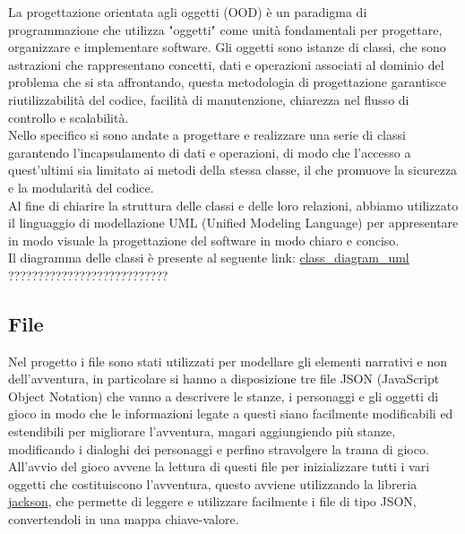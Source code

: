 \documentclass[italian,12pt,a4paper]{article}
\begin{document}
	La progettazione orientata agli oggetti (OOD) è un paradigma di programmazione che utilizza "oggetti" come unità fondamentali per progettare, organizzare e implementare software. Gli oggetti sono istanze di classi, che sono astrazioni che rappresentano concetti, dati e operazioni associati al dominio del problema che si sta affrontando, questa metodologia di progettazione garantisce riutilizzabilità del codice, facilità di manutenzione, chiarezza nel flusso di controllo e scalabilità.\\
	\linebreak
	Nello specifico si sono andate a progettare e realizzare una serie di classi garantendo l'incapsulamento di dati e operazioni, di modo che l'accesso a quest'ultimi sia limitato ai metodi della stessa classe, il che promuove la sicurezza e la modularità del codice.\\
	\linebreak
	Al fine di chiarire la struttura delle classi e delle loro relazioni, abbiamo utilizzato il linguaggio di modellazione UML (Unified Modeling Language) per appresentare in modo visuale la progettazione del software in modo chiaro e conciso.\\
	Il diagramma delle classi è presente al seguente link: \href{AGGIUNGERE LINK ALL'IMMAGINE DELL'UML}{class\_diagram\_uml}  ???????????????????????????

	
	\subsection{File}
	Nel progetto i file sono stati utilizzati per modellare gli elementi narrativi e non dell'avventura, in particolare si hanno a disposizione tre file JSON (JavaScript Object Notation) che vanno a descrivere le stanze, i personaggi e gli oggetti di gioco in modo che le informazioni legate a questi siano facilmente modificabili ed estendibili per migliorare l'avventura, magari aggiungiendo più stanze, modificando i dialoghi dei personaggi e perfino stravolgere la trama di gioco. \\
	\linebreak
	All'avvio del gioco avvene la lettura di questi file per inizializzare tutti i vari oggetti che costituiscono l'avventura, questo avviene utilizzando la libreria \href{https://github.com/FasterXML/jackson}{jackson}, che permette di leggere e utilizzare facilmente i file di tipo JSON, convertendoli in una mappa chiave-valore.
	
\end{document}
